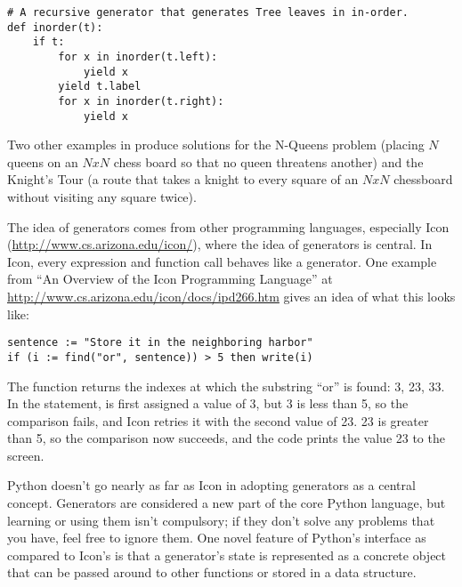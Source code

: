 \documentclass{howto}
\begin{document}
\begin{verbatim}
# A recursive generator that generates Tree leaves in in-order.
def inorder(t):
    if t:
        for x in inorder(t.left):
            yield x
        yield t.label
        for x in inorder(t.right):
            yield x
\end{verbatim}

Two other examples in  produce
solutions for the N-Queens problem (placing $N$ queens on an $NxN$
chess board so that no queen threatens another) and the Knight's Tour
(a route that takes a knight to every square of an $NxN$ chessboard
without visiting any square twice). 

The idea of generators comes from other programming languages,
especially Icon (\url{http://www.cs.arizona.edu/icon/}), where the
idea of generators is central.  In Icon, every
expression and function call behaves like a generator.  One example
from ``An Overview of the Icon Programming Language'' at
\url{http://www.cs.arizona.edu/icon/docs/ipd266.htm} gives an idea of
what this looks like:

\begin{verbatim}
sentence := "Store it in the neighboring harbor"
if (i := find("or", sentence)) > 5 then write(i)
\end{verbatim}

The  function returns the indexes at which the
substring ``or'' is found: 3, 23, 33.  In the  statement,
 is first assigned a value of 3, but 3 is less than 5, so the
comparison fails, and Icon retries it with the second value of 23.  23
is greater than 5, so the comparison now succeeds, and the code prints
the value 23 to the screen.

Python doesn't go nearly as far as Icon in adopting generators as a
central concept.  Generators are considered a new part of the core
Python language, but learning or using them isn't compulsory; if they
don't solve any problems that you have, feel free to ignore them.
One novel feature of Python's interface as compared to
Icon's is that a generator's state is represented as a concrete object
that can be passed around to other functions or stored in a data
structure.

\begin{seealso}


\end{seealso}
\end{document}
